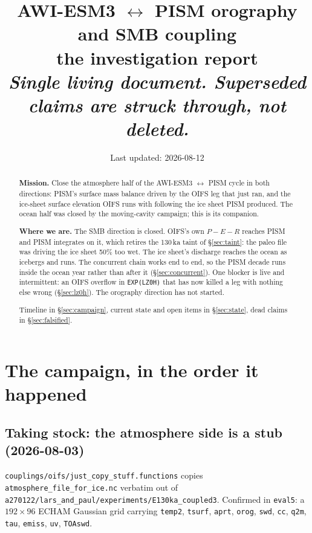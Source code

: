 \documentclass[11pt,a4paper]{article}
\title{\vspace{-1.5em}\textbf{AWI-ESM3 $\leftrightarrow$ PISM orography and SMB coupling}\\[0.3em]
       \large the investigation report\\[0.4em]
       \normalsize\textit{Single living document. Superseded claims are struck through, not deleted.}}
\author{}
\date{Last updated: 2026-08-12}
\newcommand{\code}[1]{\texttt{\small #1}}
\begin{document}
\maketitle
\vspace{-2em}

\begin{abstract}
\noindent
\textbf{Mission.} Close the atmosphere half of the AWI-ESM3 $\leftrightarrow$ PISM cycle in both
directions: PISM's surface mass balance driven by the OIFS leg that just ran, and the ice-sheet
surface elevation OIFS runs with following the ice sheet PISM produced. The ocean half was closed
by the moving-cavity campaign; this is its companion.

\medskip\noindent
\textbf{Where we are.} The SMB direction is closed. OIFS's own $P-E-R$ reaches PISM and PISM
integrates on it, which retires the 130\,ka taint of \S\ref{sec:taint}: the paleo file was driving
the ice sheet 50\% too wet. The ice sheet's discharge reaches the ocean as icebergs and runs. The
concurrent chain works end to end, so the PISM decade runs inside the ocean year rather than after
it (\S\ref{sec:concurrent}). One blocker is live and intermittent: an OIFS overflow in
\code{EXP(LZ0H)} that has now killed a leg with nothing else wrong (\S\ref{sec:lz0h}). The
orography direction has not started.

\medskip\noindent
Timeline in \S\ref{sec:campaign}, current state and open items in \S\ref{sec:state}, dead claims
in \S\ref{sec:falsified}.
\end{abstract}

\section{The campaign, in the order it happened}
\label{sec:campaign}

\subsection{Taking stock: the atmosphere side is a stub (2026-08-03)}
\label{sec:taint}

\code{couplings/oifs/just\_copy\_stuff.functions} copies \code{atmosphere\_file\_for\_ice.nc}
verbatim out of \code{a270122/lars\_and\_paul/experiments/E130ka\_coupled3}. Confirmed in
\code{eval5}: a $192\times96$ ECHAM Gaussian grid carrying \code{temp2}, \code{tsurf},
\code{aprt}, \code{orog}, \code{swd}, \code{cc}, \code{q2m}, \code{tau}, \code{emiss},
\code{uv}, \code{TOAswd}.
\end{document}
